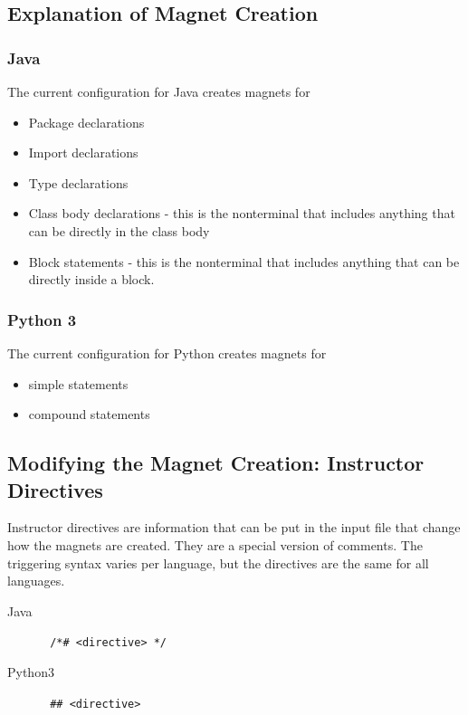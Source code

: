 \documentclass[letter,10pt]{article}
\begin{document}
\subsection{Explanation of Magnet Creation}


\subsubsection{Java}
The current configuration for Java creates magnets for
\begin{itemize}
 \item Package declarations
 \item Import declarations
 \item Type declarations
 \item Class body declarations - this is the nonterminal that includes 
anything that can be directly in the class body
 \item Block statements - this is the nonterminal that includes 
anything that can be directly inside a block.
\end{itemize}

\subsubsection{Python 3}
The current configuration for Python creates magnets for
\begin{itemize}
 \item simple statements
 \item compound statements
\end{itemize}


\subsection{Modifying the Magnet Creation: Instructor Directives}
Instructor directives are information that can be put in the input file 
that change how the magnets are created. They are a special version of 
comments. The triggering syntax varies per language, but the directives 
are the same for all languages.

\begin{description}
 \item [Java] \verb~ /*# <directive> */~
 \item [Python3] \verb~ ## <directive>~
\end{description}
\end{document}
